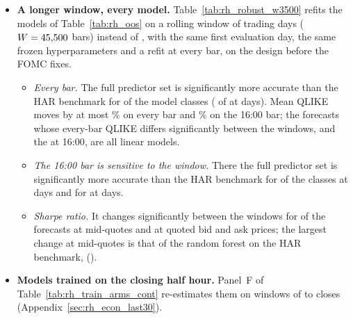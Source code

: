 \begin{itemize}
  \rhwsEnetClosePctMax\%. %

\item \textbf{A longer window, every model.} Table~\ref{tab:rh_robust_w3500} refits the models of
  Table~\ref{tab:rh_oos} on a rolling window of \rhrbWinLong{} trading days ($W = 45{,}500$ bars) instead
  of \rhrbWinMain, with the same first evaluation day, the same frozen hyperparameters and a refit at every bar, on
  the design before the FOMC fixes.
  \begin{itemize}
  \item \emph{Every bar.} The full predictor set is significantly more accurate than the HAR benchmark for
    \rhrbNFullLowerSigBarLong{} of the \rhrbNModelsLong{} model classes (\rhrbNFullLowerSigBarMain{} of
    \rhrbNModelsMain{} at \rhrbWinMain{} days). Mean QLIKE moves by at most \rhrbMaxAbsPctBar\% on every bar and
    \rhrbMaxAbsPctClose\% on the 16:00 bar; the \rhrbNSigBar{} forecasts whose every-bar QLIKE differs significantly
    between the windows, and the \rhrbNSigClose{} at 16:00, are all linear models.
  \item \emph{The 16:00 bar is sensitive to the window.} There the full predictor set is significantly more accurate
    than the HAR benchmark for \rhrbNFullLowerSigCloseLong{} of the \rhrbNModelsLong{} classes at \rhrbWinLong{}
    days and for \rhrbNFullLowerSigCloseMain{} at \rhrbWinMain{} days.
  \item \emph{Sharpe ratio.} It changes significantly between the windows for \rhrbNSRSigMid{} of the \rhrbNArms{}
    forecasts at mid-quotes and \rhrbNSRSigBa{} at quoted bid and ask prices; the largest change at mid-quotes is
    that of the random forest on the HAR benchmark, \rhrbDSRRfHarMid{} (\rhrbPSRRfHarMid).
  \end{itemize}

\item \textbf{Models trained on the closing half hour.} Panel~F of Table~\ref{tab:rh_train_arms_cont} re-estimates
  them on windows of \rhtaWsMin{} to \rhtaWsMax{} closes (Appendix~\ref{sec:rh_econ_last30}).
\end{itemize}

